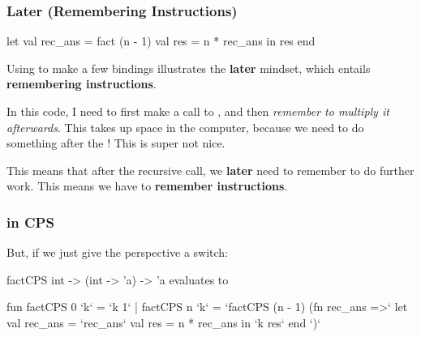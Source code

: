 \documentclass[aspectratio=169, handout]{beamer}
\begin{document}
\begin{frame}[fragile]
  \frametitle{Later (Remembering Instructions)}

  \begin{codeblock}
    let 
      val rec_ans = fact (n - 1) 
      val res = n * rec_ans
    in
      res
    end
  \end{codeblock}

  Using  to make a few bindings illustrates the \textbf{later} mindset,
  which entails \textbf{remembering instructions}.

  \pause
  \vspace{\fill}

  In this code, I need to first make a call to , and then
  \textit{remember to multiply it afterwards}. This takes up space in the computer,
  because we need to do something after the ! This is super not nice.

  \pause
  \vspace{\fill}

  This means that after the recursive call, we \textbf{later} need to remember to
  do further work. This means we have to \textbf{remember instructions}. 
\end{frame}

\begin{frame}[fragile]
  \frametitle{ in CPS}

  But, if we just give the perspective a switch:

  \pause
  \vspace{\fill}

  \spec
    {factCPS}
    {int -> (int -> 'a) -> 'a}
    {}
    { evaluates to }

  \pause
  \vspace{\fill}

  {\small
  \begin{codeblock}
    fun factCPS 0 `k` = `k 1`
      | factCPS n `k` = 
        `factCPS (n - 1) (fn rec_ans =>`
          let 
            val rec_ans = `rec_ans`
            val res = n * rec_ans
          in
            `k res`
          end
        `)`
  \end{codeblock}
  }
\end{frame}
\end{document}
